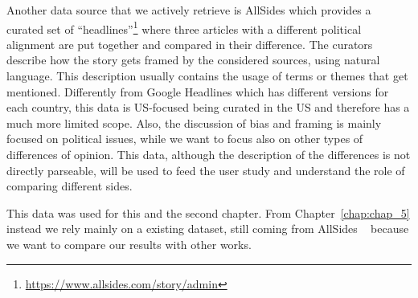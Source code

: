 Another data source that we actively retrieve is AllSides which provides a curated set of ``headlines''\footnote{\url{https://www.allsides.com/story/admin}} where three articles with a different political alignment are put together and compared in their difference.
The curators describe how the story gets framed by the considered sources, using natural language.
This description usually contains the usage of terms or themes that get mentioned.
Differently from Google Headlines which has different versions for each country, this data is US-focused being curated in the US and therefore has a much more limited scope. Also, the discussion of bias and framing is mainly focused on political issues, while we want to focus also on other types of differences of opinion.
This data, although the description of the differences is not directly parseable, will be used to feed the user study and understand the role of comparing different sides.



This data was used for this and the second chapter. From Chapter~\ref{chap:chap_5} instead we rely mainly on a existing dataset, still coming from AllSides ~\cite{baly-dataset} because we want to compare our results with other works.


